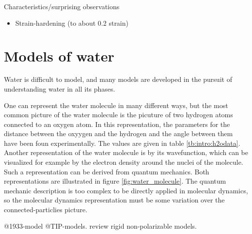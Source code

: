 Characteristics/surprising observations
\begin{itemize}
\item Strain-hardening (to about 0.2 strain)
\end{itemize}

\section{Models of water}
Water is difficult to model, and many models are developed in the pursuit of understanding water in all its phases. 

One can represent the water molecule in many different ways, but the most common picture of the water molecule is the picuture of two hydrogen atoms connected to an oxygen atom. In this representation, the parameters for the distance between the oxyygen and the hydrogen and the angle between them have been foun experimentally. The values are given in table \ref{tb:intro:h2odata}. Another representation of the water molecule is by its wavefunction, which can be visualized for example by the electron density around the nuclei of the molecule. Such a representation can be derived from quantum mechanics. Both representations are illustrated in figure \ref{fig:water_molecule}. The quantum mechanic description is too complex to be directly applied in molecular dynamics, so the molecular dynamics representation must be some variation over the connected-particlies picture. 


@1933-model @TIP-models.  \citet{Vega2011} review rigid non-polarizable models.

